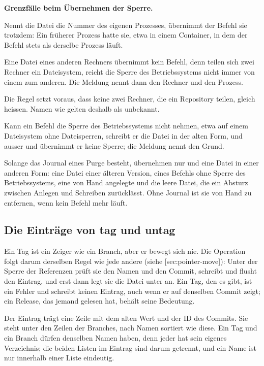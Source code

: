 {\startinfobox
{\bf Grenzfälle beim Übernehmen der Sperre.}
\startitemize
\item Nennt die Datei die Nummer des eigenen Prozesses, übernimmt der Befehl sie trotzdem:
Ein früherer Prozess hatte sie,
etwa in einem Container, in dem der Befehl stets als derselbe Prozess läuft.
\item Eine Datei eines anderen Rechners übernimmt kein Befehl,
denn teilen sich zwei Rechner ein Dateisystem,
reicht die Sperre des Betriebssystems nicht immer von einem zum anderen.
Die Meldung nennt dann den Rechner und den Prozess.
\item Die Regel setzt voraus, dass keine zwei Rechner, die ein Repository teilen, gleich heissen.
Namen wie  gelten deshalb als unbekannt.
\item Kann ein Befehl die Sperre des Betriebssystems nicht nehmen,
etwa auf einem Dateisystem ohne Dateisperren,
schreibt er die Datei in der alten Form,
und ausser  und  übernimmt er keine Sperre;
die Meldung nennt den Grund.
\item Solange das Journal eines Purge besteht,
übernehmen nur  und  eine Datei in einer anderen Form:
eine Datei einer älteren Version, eines Befehls ohne Sperre des Betriebssystems,
eine von Hand angelegte und die leere Datei,
die ein Absturz zwischen Anlegen und Schreiben zurücklässt.
Ohne Journal ist sie von Hand zu entfernen, wenn kein Befehl mehr läuft.
\stopitemize
\stopinfobox

\subsection[sec:tag-entry]{Die Einträge von tag und untag}

Ein Tag ist ein Zeiger wie ein Branch, aber er bewegt sich nie. Die Operation 
folgt darum derselben Regel wie jede andere (siehe [sec:pointer-move]):
Unter der Sperre der Referenzen prüft sie den Namen und den Commit, schreibt und flusht den
Eintrag, und erst dann legt sie die Datei unter  an.
Ein Tag, den es gibt, ist ein Fehler und schreibt keinen Eintrag, auch wenn er auf denselben
Commit zeigt; ein Release, das jemand gelesen hat, behält seine Bedeutung.

Der Eintrag trägt eine Zeile  mit dem alten Wert \type{-} und der ID des Commits.
Sie steht unter den Zeilen der Branches, nach Namen sortiert wie diese. Ein Tag und ein Branch
dürfen denselben Namen haben, denn jeder hat sein eigenes Verzeichnis; die beiden Listen im
Eintrag sind darum getrennt, und ein Name ist nur innerhalb einer Liste eindeutig.

}
